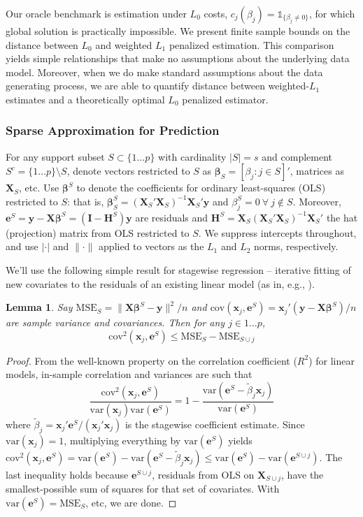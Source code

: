 \documentclass[12pt]{article}
\newtheorem{lemma}{\sc Lemma}[section]
\newcommand{\bs}[1]{\boldsymbol{#1}}
\newcommand{\mr}[1]{\mathrm{#1}}
\newcommand{\bm}[1]{\mathbf{#1}}
\newcommand{\ds}[1]{\mathds{#1}}
\begin{document}
Our oracle benchmark is estimation under $L_0$ costs, $c_j(\beta_j) =
\ds{1}_{\{\beta_j\neq0\}}$, for which global solution is practically
impossible. We present finite sample bounds on the
distance  between  $L_0$  and weighted
$L_1$ penalized estimation.  This comparison yields simple relationships that
make no assumptions about the underlying data model. Moreover, when we do make
standard assumptions about the data generating process, we are able to
quantify distance between weighted-$L_1$ estimates and a theoretically optimal
$L_0$ penalized estimator.


\subsubsection{Sparse Approximation for Prediction}

 For any support subset $S \subset \{1\ldots p\}$ with cardinality $|S|=s$ and
complement $S^c = \{1\ldots p\}\setminus S$, denote vectors restricted to $S$
as $\bm{\beta}_S = [\beta_j:j\in S]'$, matrices as $\bm{X}_S$, etc.  Use
$\bs{\beta}^S$ to denote the coefficients for ordinary
least-squares (OLS) restricted to $S$: that is, $\bs{\beta}^S_S =
(\bm{X}_S'\bm{X}_S)^{-1}\bm{X}_S'\bm{y}$ and $\beta^{S}_j = 0~\forall~j\notin
S$.  Moreover, $\bm{e}^S = \bm{y}-\bm{X}\bs{\beta}^S =
(\bm{I}-\bm{H}^S)\bm{y}$ are residuals and $\bm{H}^S =
\bm{X}_S(\bm{X}_S'\bm{X}_S)^{-1}\bm{X}_S'$ the hat (projection) matrix from OLS restricted to $S$.  We suppress intercepts throughout, and use $|\cdot|$ and $\|\cdot\|$ applied to vectors as the $L_1$ and $L_2$ norms, respectively.

We'll use the following simple result for stagewise regression -- iterative fitting of new covariates to the residuals of an existing linear model (as in, e.g., \citealt{goldberger_stepwise_1961}). 
\begin{lemma}\label{SSElemma}
Say $\mr{MSE}_S = \|\bm{X}\bs{\beta}^S-\bm{y}\|^2/n$ and 
$\mr{cov}(\bs{x}_j,\bm{e}^S) = \bs{x}_j'(\bm{y}-\bm{X}\bs{\beta}^S)/n$ are sample variance and covariances.  Then for any $j \in 1\ldots p$, 
\[
\mr{cov}^2(\bs{x}_j,\bm{e}^S) \leq \mr{MSE}_S - \mr{MSE}_{S\cup j}
\]
\end{lemma}
\begin{proof}
From the well-known property on the correlation coefficient ($R^2$) for linear models,   
in-sample correlation and variances are such that
\[
\frac{\mr{cov}^2(\bs{x}_j,\bm{e}^S)}{\mr{var}(\bs{x}_j)\mr{var}(\bm{e}^S)} = 1 - \frac{\mr{var}(\bm{e}^S-\tilde\beta_j\bs{x}_j)}{\mr{var}(\bm{e}^S)}
\]
where $\tilde\beta_j = \bs{x}_j'\bm{e}^S/(\bs{x}_j'\bs{x}_j)$ is the stagewise coefficient estimate.  Since $\mr{var}(\bs{x}_j)=1$, multiplying everything by $\mr{var}(\bm{e}^S)$ yields $\mr{cov}^2(\bs{x}_j,\bm{e}^S) =
\mr{var}(\bm{e}^S) - \mr{var}(\bm{e}^S-\tilde\beta_j\bs{x}_j)
\leq \mr{var}(\bm{e}^S) - \mr{var}(\bm{e}^{S\cup j})$.
The last inequality holds because $\bm{e}^{S\cup j}$, residuals from OLS on $\bm{X}_{S\cup j}$, have the smallest-possible sum of squares for that set of covariates.  With $\mr{var}(\bm{e}^S) = \mr{MSE}_S$, etc, we are done.
\end{proof}
\end{document}
